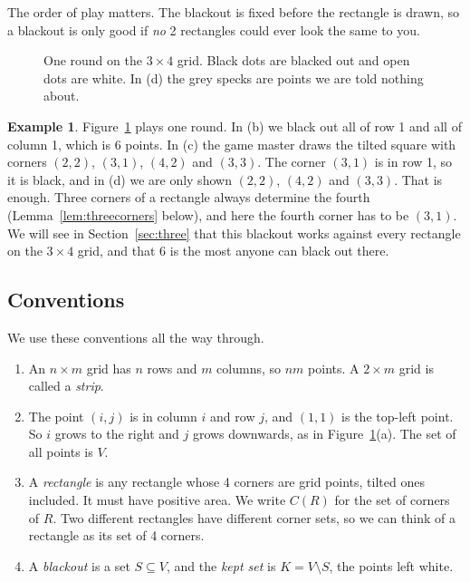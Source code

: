 \documentclass[11pt]{article}
\theoremstyle{definition}
\newtheorem{example}[theorem]{Example}
\theoremstyle{remark}
\begin{document}
The order of play matters. The blackout is fixed before the rectangle is drawn, so a blackout
is only good if \emph{no} 2 rectangles could ever look the same to you.

\begin{figure}[htbp]
\centering

\caption{One round on the $3\times4$ grid. Black dots are blacked out and open dots are white.
In (d) the grey specks are points we are told nothing about.}
\label{fig:game}
\end{figure}

\begin{example}\label{ex:game}
Figure~\ref{fig:game} plays one round. In (b) we black out all of row 1 and all of column 1,
which is 6 points. In (c) the game master draws the tilted square with corners $(2,2)$, $(3,1)$,
$(4,2)$ and $(3,3)$. The corner $(3,1)$ is in row 1, so it is black, and in (d) we are only shown
$(2,2)$, $(4,2)$ and $(3,3)$. That is enough. Three corners of a rectangle always determine the
fourth (Lemma~\ref{lem:threecorners} below), and here the fourth corner has to be $(3,1)$. We
will see in Section~\ref{sec:three} that this blackout works against every rectangle on the
$3\times4$ grid, and that 6 is the most anyone can black out there.
\end{example}

\subsection{Conventions}\label{sec:conventions}

We use these conventions all the way through.
\begin{enumerate}[leftmargin=*,itemsep=1pt]
\item An $n\times m$ grid has $n$ rows and $m$ columns, so $nm$ points. A $2\times m$ grid is
called a \emph{strip}.
\item The point $(i,j)$ is in column $i$ and row $j$, and $(1,1)$ is the top-left point. So $i$
grows to the right and $j$ grows downwards, as in Figure~\ref{fig:game}(a). The set of all
points is $V$.
\item A \emph{rectangle} is any rectangle whose 4 corners are grid points, tilted ones included.
It must have positive area. We write $C(R)$ for the set of corners of $R$. Two different
rectangles have different corner sets, so we can think of a rectangle as its set of 4 corners.
\item A \emph{blackout} is a set $S\subseteq V$, and the \emph{kept set} is $K=V\setminus S$,
the points left white.
\end{enumerate}
\end{document}
